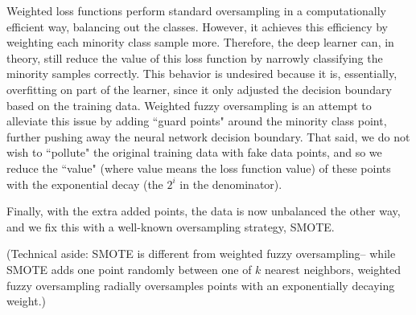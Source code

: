 \documentclass[10pt,compsoc,twocolumn]{IEEEtran}
\newcommand{\respto}[1]{
\fcolorbox{black}{black!15}{%
\label{resp:#1}%
\bf\scriptsize R{#1}}}
\newcommand{\BLUE}{\color{blue}}
\newcommand{\BLACK}{\color{black}}
\begin{document}
\BLUE
Weighted loss functions perform standard oversampling in a computationally efficient way, balancing out the classes. However, it achieves this efficiency by weighting each minority class sample more. Therefore, the deep learner can, in theory, still reduce the value of this loss function by narrowly classifying the minority samples correctly. This behavior is undesired because it is, essentially, overfitting on part of the learner, since it only adjusted the decision boundary based on the training data. Weighted fuzzy oversampling is an attempt to alleviate this issue by adding ``guard points" around the minority class point, further pushing away the neural network decision boundary. That said, we do not wish to ``pollute" the original training data with fake data points, and so we reduce the ``value" (where value means the loss function value) of these points with the exponential decay (the $2^i$ in the denominator).

Finally, with the extra added points, the data is now unbalanced the other way, and we fix this with a well-known oversampling strategy, SMOTE.
\respto{1a3.1}
\BLACK

(Technical aside:  SMOTE is different from weighted fuzzy oversampling-- while SMOTE adds one point randomly between one of $k$ nearest neighbors, weighted fuzzy oversampling radially oversamples points with an exponentially decaying weight.)






\end{document}
